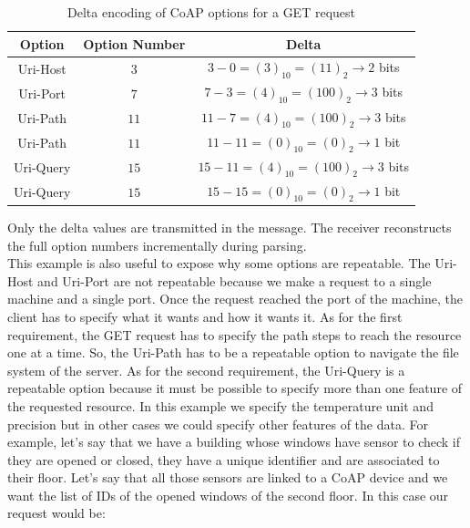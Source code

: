 \documentclass{scrbook}
\begin{document}
\begin{table}[h]
    \centering
    \begin{tabular}{|c|c|c|}
        \hline
        \textbf{Option} & \textbf{Option Number} & \textbf{Delta} \\
        \hline
        Uri-Host & $3$ & $3 - 0 = (3)_{10} = (11)_2 \rightarrow 2$ bits \\
        Uri-Port & $7$ & $7 - 3 = (4)_{10} = (100)_2 \rightarrow 3$ bits \\
        Uri-Path & $11$ & $11 - 7 = (4)_{10} = (100)_2 \rightarrow 3$ bits \\
        Uri-Path & $11$ & $11 - 11 = (0)_{10} = (0)_2 \rightarrow 1$ bit \\
        Uri-Query & $15$ & $15 - 11 = (4)_{10} = (100)_2 \rightarrow 3$ bits \\
        Uri-Query & $15$ & $15 - 15 = (0)_{10} = (0)_2 \rightarrow 1$ bit \\
        \hline
    \end{tabular}
    \caption{Delta encoding of CoAP options for a GET request}
    \label{tab:coap-delta-example}
\end{table}

Only the delta values are transmitted in the message. The receiver reconstructs the full option numbers incrementally during parsing. \\

This example is also useful to expose why some options are repeatable.
The Uri-Host and Uri-Port are not repeatable because we make a request to a single machine and a single port. Once the request reached the port of the machine, the client has to specify what it wants and how it wants it. As for the first requirement, the GET request has to specify the path steps to reach the resource one at a time. So, the Uri-Path has to be a repeatable option to navigate the file system of the server. As for the second requirement, the Uri-Query is a repeatable option because it must be possible to specify more than one feature of the requested resource. In this example we specify the temperature unit and precision but in other cases we could specify other features of the data. For example, let's say that we have a building whose windows have sensor to check if they are opened or closed, they have a unique identifier and are associated to their floor. Let's say that all those sensors are linked to a CoAP device and we want the list of IDs of the opened windows of the second floor. In this case our request would be:
\end{document}
